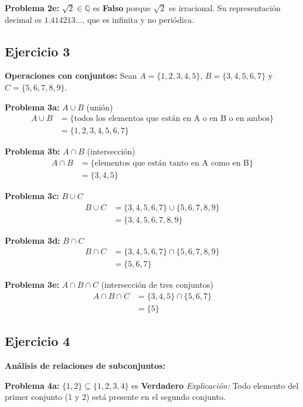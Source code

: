 \textbf{Problema 2e:} $\sqrt{2} \in \mathbb{Q}$ es \textbf{Falso} porque $\sqrt{2}$ es irracional. Su representación decimal es $1.414213...$, que es infinita y no periódica.

\subsection*{Ejercicio 3}

\textbf{Operaciones con conjuntos:} Sean $A = \{1, 2, 3, 4, 5\}$, $B = \{3, 4, 5, 6, 7\}$ y $C = \{5, 6, 7, 8, 9\}$.

\textbf{Problema 3a:} $A \cup B$ (unión)
\begin{align}
A \cup B &= \{\text{todos los elementos que están en A o en B o en ambos}\} \\
&= \{1, 2, 3, 4, 5, 6, 7\}
\end{align}

\textbf{Problema 3b:} $A \cap B$ (intersección)
\begin{align}
A \cap B &= \{\text{elementos que están tanto en A como en B}\} \\
&= \{3, 4, 5\}
\end{align}

\textbf{Problema 3c:} $B \cup C$
\begin{align}
B \cup C &= \{3, 4, 5, 6, 7\} \cup \{5, 6, 7, 8, 9\} \\
&= \{3, 4, 5, 6, 7, 8, 9\}
\end{align}

\textbf{Problema 3d:} $B \cap C$
\begin{align}
B \cap C &= \{3, 4, 5, 6, 7\} \cap \{5, 6, 7, 8, 9\} \\
&= \{5, 6, 7\}
\end{align}

\textbf{Problema 3e:} $A \cap B \cap C$ (intersección de tres conjuntos)
\begin{align}
A \cap B \cap C &= \{3, 4, 5\} \cap \{5, 6, 7\} \\
&= \{5\}
\end{align}

\subsection*{Ejercicio 4}

\textbf{Análisis de relaciones de subconjuntos:}

\textbf{Problema 4a:} $\{1, 2\} \subseteq \{1, 2, 3, 4\}$ es \textbf{Verdadero}
\textit{Explicación:} Todo elemento del primer conjunto (1 y 2) está presente en el segundo conjunto.

